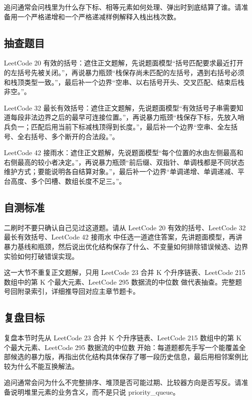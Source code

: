 追问通常会问栈里为什么存下标、相等元素如何处理、弹出时到底结算了谁。请准备用一个严格递增和一个严格递减样例解释入栈出栈次数。

\subsection{抽查题目}

LeetCode 20 有效的括号：遮住正文题解，先说题面模型“括号匹配要求最近打开的左括号先被关闭。”，再说暴力瓶颈“栈保存尚未匹配的左括号，遇到右括号必须和栈顶类型一致。”，最后补一个边界“空串、以右括号开头、交叉匹配、结束后栈非空。”。

LeetCode 32 最长有效括号：遮住正文题解，先说题面模型“有效括号子串需要知道每段非法边界之后的最早可连接位置。”，再说暴力瓶颈“栈保存下标，先放入哨兵负一；匹配后用当前下标减栈顶得到长度。”，最后补一个边界“空串、全左括号、全右括号、多个断开的合法段。”。

LeetCode 42 接雨水：遮住正文题解，先说题面模型“每个位置的水由左侧最高和右侧最高的较小者决定。”，再说暴力瓶颈“前后缀、双指针、单调栈都是不同状态维护方式；要能说明各自结算对象。”，最后补一个边界“单调递增、单调递减、平台高度、多个凹槽、数组长度不足三。”。

\subsection{自测标准}

二刷时不要只确认自己见过这道题。请从 LeetCode 20 有效的括号、LeetCode 32 最长有效括号、LeetCode 42 接雨水 中任选一道遮住答案，先讲题面模型，再讲暴力基线和瓶颈，然后说出优化结构保存了什么、不变量如何排除错误候选、边界实验如何打破错误实现。

这一大节不重复正文题解，只用 LeetCode 23 合并 K 个升序链表、LeetCode 215 数组中的第 K 个最大元素、LeetCode 295 数据流的中位数 做代表抽查。完整题号回附录索引，详细推导回对应主章节题卡。

\subsection{复盘目标}

复盘本节时先从 LeetCode 23 合并 K 个升序链表、LeetCode 215 数组中的第 K 个最大元素、LeetCode 295 数据流的中位数 开始：每道题都先手写一个能覆盖全部候选的暴力版，再指出优化结构具体保存了哪一段历史信息，最后用相邻案例比较为什么不能互换解法。

追问通常会问为什么不完整排序、堆顶是否可能过期、比较器方向是否写反。请准备说明堆里元素的业务含义，而不是只说 priority\_queue。

